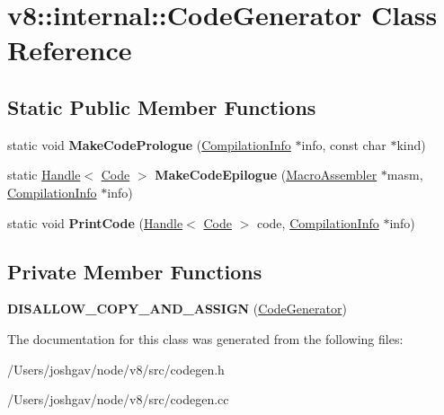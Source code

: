 \hypertarget{classv8_1_1internal_1_1_code_generator}{}\section{v8\+:\+:internal\+:\+:Code\+Generator Class Reference}
\label{classv8_1_1internal_1_1_code_generator}
\subsection*{Static Public Member Functions}
\begin{DoxyCompactItemize}
\item 
static void {\bfseries Make\+Code\+Prologue} (\hyperlink{classv8_1_1internal_1_1_compilation_info}{Compilation\+Info} $\ast$info, const char $\ast$kind)\hypertarget{classv8_1_1internal_1_1_code_generator_a931dbe0924d277d6a48d11e756fbaa9f}{}\label{classv8_1_1internal_1_1_code_generator_a931dbe0924d277d6a48d11e756fbaa9f}

\item 
static \hyperlink{classv8_1_1internal_1_1_handle}{Handle}$<$ \hyperlink{classv8_1_1internal_1_1_code}{Code} $>$ {\bfseries Make\+Code\+Epilogue} (\hyperlink{classv8_1_1internal_1_1_macro_assembler}{Macro\+Assembler} $\ast$masm, \hyperlink{classv8_1_1internal_1_1_compilation_info}{Compilation\+Info} $\ast$info)\hypertarget{classv8_1_1internal_1_1_code_generator_ae03b12064b56606d00ea5ea00fb629b8}{}\label{classv8_1_1internal_1_1_code_generator_ae03b12064b56606d00ea5ea00fb629b8}

\item 
static void {\bfseries Print\+Code} (\hyperlink{classv8_1_1internal_1_1_handle}{Handle}$<$ \hyperlink{classv8_1_1internal_1_1_code}{Code} $>$ code, \hyperlink{classv8_1_1internal_1_1_compilation_info}{Compilation\+Info} $\ast$info)\hypertarget{classv8_1_1internal_1_1_code_generator_a1fa768e3e0686b6dbd5bcf2b50f05023}{}\label{classv8_1_1internal_1_1_code_generator_a1fa768e3e0686b6dbd5bcf2b50f05023}

\end{DoxyCompactItemize}
\subsection*{Private Member Functions}
\begin{DoxyCompactItemize}
\item 
{\bfseries D\+I\+S\+A\+L\+L\+O\+W\+\_\+\+C\+O\+P\+Y\+\_\+\+A\+N\+D\+\_\+\+A\+S\+S\+I\+GN} (\hyperlink{classv8_1_1internal_1_1_code_generator}{Code\+Generator})\hypertarget{classv8_1_1internal_1_1_code_generator_aadefb53868e7a88b3fb5c9c5c66324b4}{}\label{classv8_1_1internal_1_1_code_generator_aadefb53868e7a88b3fb5c9c5c66324b4}

\end{DoxyCompactItemize}


The documentation for this class was generated from the following files\+:\begin{DoxyCompactItemize}
\item 
/\+Users/joshgav/node/v8/src/codegen.\+h\item 
/\+Users/joshgav/node/v8/src/codegen.\+cc\end{DoxyCompactItemize}
